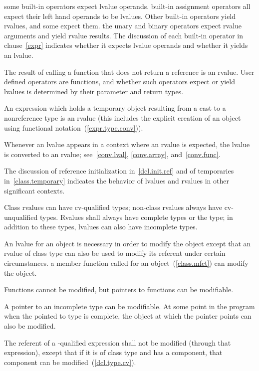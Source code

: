 \pnum
\enternote some built-in operators expect lvalue operands.
\enterexample built-in assignment operators all expect their left hand
operands to be lvalues. \exitexample
Other built-in operators yield rvalues, and some expect them.
\enterexample the unary and binary \tcode{+} operators expect rvalue
arguments and yield rvalue results. \exitexample
The discussion of each built-in operator in clause~\ref{expr} indicates
whether it expects lvalue operands and whether it yields an lvalue.
\exitnote

\pnum
The result of calling a function that does not return a reference is an
rvalue. User defined operators are functions, and whether such operators
expect or yield lvalues is determined by their parameter and return types.

\pnum
An expression which holds a temporary object resulting from a cast to a
nonreference type is an rvalue (this includes the explicit creation of an
object using functional notation~(\ref{expr.type.conv})).

\pnum
Whenever an lvalue appears in a context where an rvalue is expected,
the lvalue is converted to an rvalue; see~\ref{conv.lval}, \ref{conv.array},
and~\ref{conv.func}.

\pnum
The discussion of reference initialization in~\ref{dcl.init.ref} and of
temporaries in~\ref{class.temporary} indicates the behavior of lvalues
and rvalues in other significant contexts.

\pnum
Class rvalues can have cv-qualified types; non-class rvalues always have
cv-unqualified types. Rvalues shall always have complete types or the
 type; in addition to these types, lvalues can also have
incomplete types.

\pnum
An lvalue for an object is necessary in order to modify the object
except that an rvalue of class type can also be used to modify its
referent under certain circumstances. \enterexample a member function
called for an object~(\ref{class.mfct}) can modify the object.
\exitexample

\pnum
Functions cannot be modified, but pointers to functions can be
modifiable.

\pnum
A pointer to an incomplete type can be modifiable. At some point in the
program when the pointed to type is complete, the object at which the
pointer points can also be modified.

\pnum
The referent of a -qualified expression shall not be
modified (through that expression), except that if it is of class type
and has a  component, that component can be
modified~(\ref{dcl.type.cv}).

